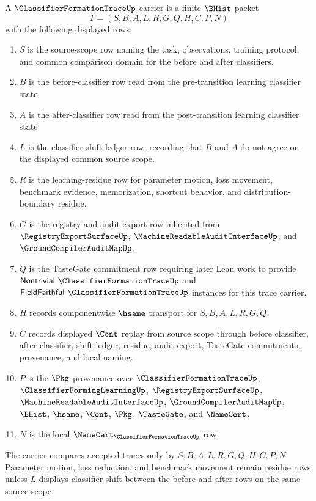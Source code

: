 \begin{definition}
\label{def:classifier-formation-trace-carrier}
A $\ClassifierFormationTraceUp$ carrier is a finite $\BHist$ packet
$$
T=(S,B,A,L,R,G,Q,H,C,P,N)
$$
with the following displayed rows:
\begin{enumerate}
\item $S$ is the source-scope row naming the task, observations, training protocol, and common comparison domain for the before and after classifiers.
\item $B$ is the before-classifier row read from the pre-transition learning classifier state.
\item $A$ is the after-classifier row read from the post-transition learning classifier state.
\item $L$ is the classifier-shift ledger row, recording that $B$ and $A$ do not agree on the displayed common source scope.
\item $R$ is the learning-residue row for parameter motion, loss movement, benchmark evidence, memorization, shortcut behavior, and distribution-boundary residue.
\item $G$ is the registry and audit export row inherited from $\RegistryExportSurfaceUp$, $\MachineReadableAuditInterfaceUp$, and $\GroundCompilerAuditMapUp$.
\item $Q$ is the TasteGate commitment row requiring later Lean work to provide $\mathsf{Nontrivial}\ \ClassifierFormationTraceUp$ and $\mathsf{FieldFaithful}\ \ClassifierFormationTraceUp$ instances for this trace carrier.
\item $H$ records componentwise $\hsame$ transport for $S,B,A,L,R,G,Q$.
\item $C$ records displayed $\Cont$ replay from source scope through before classifier, after classifier, shift ledger, residue, audit export, TasteGate commitments, provenance, and local naming.
\item $P$ is the $\Pkg$ provenance over $\ClassifierFormationTraceUp$, $\ClassifierFormingLearningUp$, $\RegistryExportSurfaceUp$, $\MachineReadableAuditInterfaceUp$, $\GroundCompilerAuditMapUp$, $\BHist$, $\hsame$, $\Cont$, $\Pkg$, $\TasteGate$, and $\NameCert$.
\item $N$ is the local $\NameCert_{\ClassifierFormationTraceUp}$ row.
\end{enumerate}
The carrier compares accepted traces only by $S,B,A,L,R,G,Q,H,C,P,N$. Parameter motion, loss reduction, and benchmark movement remain residue rows unless $L$ displays classifier shift between the before and after rows on the same source scope.
\end{definition}

